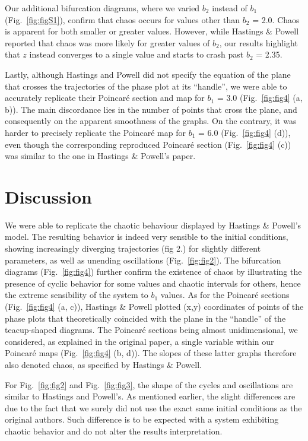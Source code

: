 \documentclass[
]{article}
\begin{document}
Our additional bifurcation diagrams, where we varied \(b_2\) instead of
\(b_1\) (Fig.~\ref{fig:figS1}), confirm that chaos occurs for values
other than \(b_2\) = 2.0. Chaos is apparent for both smaller or greater
values. However, while Hastings \& Powell reported that chaos was more
likely for greater values of \(b_2\), our results highlight that \(z\)
instead converges to a single value and starts to crash past \(b_2\) =
2.35.

Lastly, although Hastings and Powell did not specify the equation of the
plane that crosses the trajectories of the phase plot at its ``handle'',
we were able to accurately replicate their Poincaré section and map for
\(b_1\) = 3.0 (Fig.~\ref{fig:fig4} (a, b)). The main discordance lies in
the number of points that cross the plane, and consequently on the
apparent smoothness of the graphs. On the contrary, it was harder to
precisely replicate the Poincaré map for \(b_1\) = 6.0
(Fig.~\ref{fig:fig4} (d)), even though the corresponding reproduced
Poincaré section (Fig.~\ref{fig:fig4} (c)) was similar to the one in
Hastings \& Powell's paper.

\hypertarget{discussion}{%
\section{Discussion}\label{discussion}}

We were able to replicate the chaotic behaviour displayed by Hastings \&
Powell's model. The resulting behavior is indeed very sensible to the
initial conditions, showing increasingly diverging trajectories (fig 2.)
for slightly different parameters, as well as unending oscillations
(Fig.~\ref{fig:fig2}). The bifurcation diagrams (Fig.~\ref{fig:fig4})
further confirm the existence of chaos by illustrating the presence of
cyclic behavior for some values and chaotic intervals for others, hence
the extreme sensibility of the system to \(b_1\) values. As for the
Poincaré sections (Fig.~\ref{fig:fig4} (a, c)), Hastings \& Powell
plotted (x,y) coordinates of points of the phase plots that
theoretically coincided with the plane in the ``handle'' of the
teacup-shaped diagrams. The Poincaré sections being almost
unidimensional, we considered, as explained in the original paper, a
single variable within our Poincaré maps (Fig.~\ref{fig:fig4} (b, d)).
The slopes of these latter graphs therefore also denoted chaos, as
specified by Hastings \& Powell.

For Fig.~\ref{fig:fig2} and Fig.~\ref{fig:fig3}, the shape of the cycles
and oscillations are similar to Hastings and Powell's. As mentioned
earlier, the slight differences are due to the fact that we surely did
not use the exact same initial conditions as the original authors. Such
difference is to be expected with a system exhibiting chaotic behavior
and do not alter the results interpretation.
\end{document}
